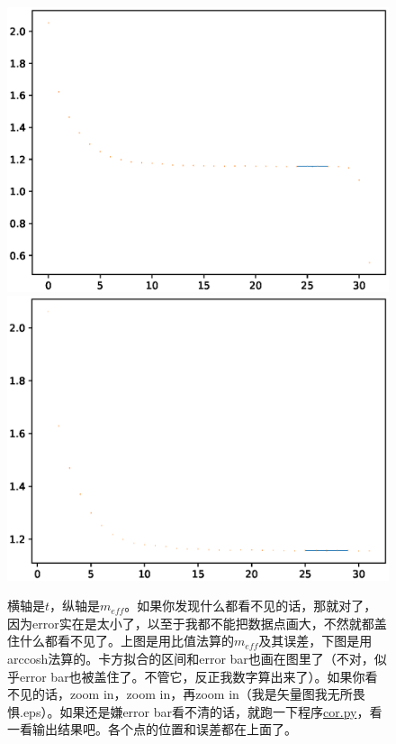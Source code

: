 \documentclass[UTF8,size=9.5]{ctexart}
\begin{document}
\begin{figure}
  \centering
  \includegraphics[width=0.8\linewidth]{ratio.eps}
  \includegraphics[width=0.8\linewidth]{acosh.eps}
  \caption{横轴是$t$，纵轴是$m_{eff}$。如果你发现什么都看不见的话，那就对了，因为error实在是太小了，以至于我都不能把数据点画大，不然就都盖住什么都看不见了。上图是用比值法算的$m_{eff}$及其误差，下图是用arccosh法算的。卡方拟合的区间和error bar也画在图里了（不对，似乎error bar也被盖住了。不管它，反正我数字算出来了）。如果你看不见的话，zoom in，zoom in，再zoom in（我是矢量图我无所畏惧.eps）。如果还是嫌error bar看不清的话，就跑一下程序\href{./cor.py}{cor.py}，看一看输出结果吧。各个点的位置和误差都在上面了。}
\end{figure}
\end{document}
